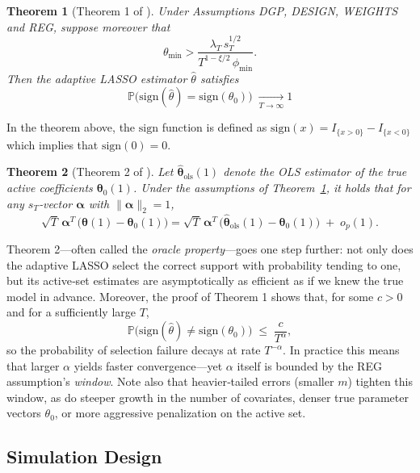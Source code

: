 \documentclass[10pt,a4paper,oneside]{article}
\newcommand{\Prob}{\mathbb{P}}
\newtheorem{theorem}{Theorem}
\begin{document}
\begin{theorem}[Theorem 1 of \cite{MEDEIROS2016255}] Under Assumptions \textup{DGP}, \textup{DESIGN}, \textup{WEIGHTS} and \textup{REG}, suppose moreover that
\[
\theta_{\min}
>
\frac{\lambda_T\,s_T^{1/2}}{
  T^{1-\xi/2}\,\phi_{\min}
}.
\]
Then the adaptive LASSO estimator $\hat\theta$ satisfies
\[
\Prob\bigl(\mathrm{sign}(\hat\theta)=\mathrm{sign}(\theta_0)\bigr)
\;\xrightarrow[T \rightarrow \infty]{} 1
\]
\label{thm:1_medeiros}
\end{theorem}

In the theorem above, the $\mathrm{sign}$ function is defined as $\mathrm{sign}(x) = I_{\{ x > 0 \}} - I_{\{ x < 0 \}}$ which implies that $\mathrm{sign}(0) = 0$.

\begin{theorem}[Theorem 2 of \cite{MEDEIROS2016255}] Let $\hat{\boldsymbol{\theta}}_{\text{ols}}{(1)}$ denote the OLS estimator of the true active coefficients $\boldsymbol{\theta}_0{(1)}$.  Under the assumptions of Theorem~\ref{thm:1_medeiros}, it holds that for any $s_T$‑vector $\boldsymbol{\alpha}$ with $\|\boldsymbol{\alpha}\|_2=1$,
\[
\sqrt{T}\,\boldsymbol{\alpha}^T\,\bigl(\hat{\boldsymbol{\theta}}{(1)} - \boldsymbol{\theta}_0{(1)}\bigr)
=
\sqrt{T}\,\boldsymbol{\alpha}^T\,\bigl(\hat{\boldsymbol{\theta}}_{\text{ols}}{(1)} - \boldsymbol{\theta}_0{(1)}\bigr)
\;+\;o_p(1).
\]
\end{theorem}

Theorem 2—often called the \textit{oracle property}—goes one step further: not only does the adaptive LASSO select the correct support with probability tending to one, but its active‐set estimates are asymptotically as efficient as if we knew the true model in advance. Moreover, the proof of Theorem 1 shows that, for some $c>0$ and for a sufficiently large \(T\),
\begin{equation}
\Prob\bigl(\mathrm{sign}(\hat\theta)\neq\mathrm{sign}(\theta_0)\bigr)
\;\le\;
\frac{c}{T^\alpha},
\label{eq:decay_rate}
\end{equation}
so the probability of selection failure decays at rate \(T^{-\alpha}\). In practice this means that larger \(\alpha\) yields faster convergence—yet \(\alpha\) itself is bounded by the REG assumption’s \textit{window}. Note also that heavier‐tailed errors (smaller \(m\)) tighten this window, as do steeper growth in the number of covariates, denser true parameter vectors \(\theta_0\), or more aggressive penalization on the active set.

\subsection{Simulation Design}
\label{subsec:simulation_design}
\end{document}

